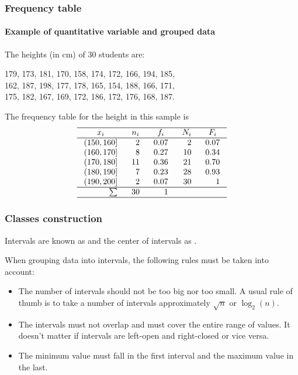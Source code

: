 \begin{frame}
\frametitle{Frequency table}
\framesubtitle{Example of quantitative variable and grouped data}
The heights (in cm) of 30 students are:
\begin{center}
179, 173, 181, 170, 158, 174, 172, 166, 194, 185,\\
162, 187, 198, 177, 178, 165, 154, 188, 166, 171,\\
175, 182, 167, 169, 172, 186, 172, 176, 168, 187.
\end{center}
The frequency table for the height in this sample is
\[
\setlength\arraycolsep{3mm}
\setlength\arrayrulewidth{0.5pt}
\begin{array}{rrrrr}
\hline
\multicolumn{1}{c}{x_i} & \multicolumn{1}{c}{n_i} & \multicolumn{1}{c}{f_i} & \multicolumn{1}{c}{N_i} & \multicolumn{1}{c}{F_i}\\
\hline
(150,160] & 2 & 0.07 & 2 & 0.07\\
(160,170] & 8 & 0.27 & 10 & 0.34\\
(170,180] & 11 & 0.36 & 21 & 0.70\\
(180,190] & 7  & 0.23 & 28 & 0.93\\
(190,200] & 2 & 0.07 & 30 & 1 \\
\hline
\sum & 30 & 1 \\
\hline
\end{array}
\]
\end{frame}


\begin{frame}
\frametitle{Classes construction}
Intervals are known as  and the center of intervals as .

When grouping data into intervals, the following rules must be taken into account: 
\begin{itemize}
\item The number of intervals should not be too big nor too small. 
A usual rule of thumb is to take a number of intervals approximately $\sqrt{n}$ or $\log_2(n)$.
\item The intervals must not overlap and must cover the entire range of values.
It doesn't matter if intervals are left-open and right-closed or vice versa. 
\item The minimum value must fall in the first interval and the maximum value in the last.
\end{itemize}
\end{frame}


